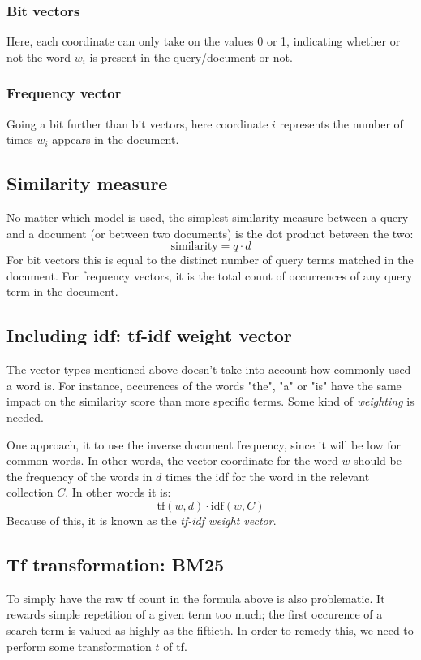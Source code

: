 \documentclass[12pt, a4paper]{article}
\numberwithin{equation}{section}
\begin{document}
\subsubsection{Bit vectors}
Here, each coordinate can only take on the values 0 or 1, indicating whether or not the word $w_i$ is present in the query/document or not.

\subsubsection{Frequency vector}
Going a bit further than bit vectors, here coordinate $i$ represents the number of times $w_i$ appears in the document.

\subsection{Similarity measure}
No matter which model is used, the simplest similarity measure between a query and a document (or between two documents) is the dot product between the two:
\begin{equation}
\textrm{similarity}=q\cdot d
\end{equation}
For bit vectors this is equal to the distinct number of query terms matched in the document. For frequency vectors, it is the total count of occurrences of any query term in the document.

\subsection{Including idf: tf-idf weight vector}
The vector types mentioned above doesn't take into account how commonly used a word is. For instance, occurences of the words "the", "a" or "is" have the same impact on the similarity score than more specific terms. Some kind of \textit{weighting} is needed.

One approach, it to use the inverse document frequency, since it will be low for common words. In other words, the vector coordinate for the word $w$ should be the frequency of the words in $d$ times the idf for the word in the relevant collection $C$. In other words it is:
\begin{equation}
\textrm{tf}(w,d)\cdot\textrm{idf}(w,C)
\end{equation}
Because of this, it is known as the \textit{tf-idf weight vector}.

\subsection{Tf transformation: BM25}
To simply have the raw tf count in the formula above is also problematic. It rewards simple repetition of a given term too much; the first occurence of a search term is valued as highly as the fiftieth. In order to remedy this, we need to perform some transformation $t$ of tf.
\end{document}
